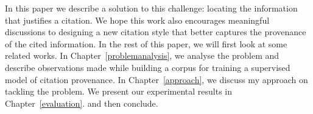 In this paper we describe a solution to this challenge: locating the information that justifies a citation. 
We hope this work also encourages meaningful discussions to designing a new citation style that better captures the provenance of the cited information. In the rest of this paper, we will first look at some related works. In Chapter~\ref{problemanalysis}, we analyse the problem and describe observations made while building a corpus for training a supervised model of citation provenance. In Chapter~\ref{approach}, we discuss my approach on tackling the problem. We present our experimental results in Chapter~\ref{evaluation}. and then conclude.